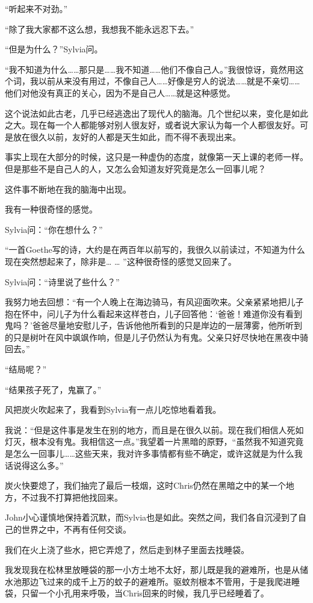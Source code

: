 \documentclass[UTF8]{article}
\begin{document}
\par “听起来不对劲。”
\par “除了我大家都不这么想，我想我不能永远忍下去。”
\par “但是为什么？”Sylvia问。
\par “我不知道为什么……那只是……我不知道……他们不像自己人。”我很惊讶，竟然用这个词，我以前从来没有用过，不像自己人……好像是穷人的说法……就是不亲切……他们对他没有真正的关心，因为不是自己人……就是这种感觉。
\par 这个说法如此古老，几乎已经逃逸出了现代人的脑海。几个世纪以来，变化是如此之大。现在每一个人都能够对别人很友好，或者说大家认为每一个人都很友好。可是放在很久以前，友好的人都是天生如此，而不得不表现出来。
\par 事实上现在大部分的时候，这只是一种虚伪的态度，就像第一天上课的老师一样。但是那些不是自己人的人，又怎么会知道友好究竟是怎么一回事儿呢？
\par 这件事不断地在我的脑海中出现。
\par 我有一种很奇怪的感觉。
\par Sylvia问：“你在想什么？”
\par “一首Goethe写的诗，大约是在两百年以前写的，我很久以前读过，不知道为什么现在突然想起来了，除非是… … ”这种很奇怪的感觉又回来了。
\par Sylvia问：“诗里说了些什么？”
\par 我努力地去回想：“有一个人晚上在海边骑马，有风迎面吹来。父亲紧紧地把儿子抱在怀中，问儿子为什么看起来这样苍白，儿子回答他：‘爸爸！难道你没有看到鬼吗？’爸爸尽量地安慰儿子，告诉他他所看到的只是岸边的一层薄雾，他所听到的只是树叶在风中飒飒作响，但是儿子仍然认为有鬼。父亲只好尽快地在黑夜中骑回去。”
\par “结局呢？”
\par “结果孩子死了，鬼赢了。”
\par 风把炭火吹起来了，我看到Sylvia有一点儿吃惊地看着我。
\par 我说：“但是这件事是发生在别的地方，而且是在很久以前。现在我们相信人死如灯灭，根本没有鬼。我相信这一点。”我望着一片黑暗的原野，“虽然我不知道究竟是怎么一回事儿……这些天来，我对许多事情都有些不确定，或许这就是为什么我话说得这么多。”
\par 炭火快要熄了，我们抽完了最后一枝烟，这时Chris仍然在黑暗之中的某一个地方，不过我不打算把他找回来。
\par John小心谨慎地保持着沉默，而Sylvia也是如此。突然之间，我们各自沉浸到了自己的世界之中，不再有任何交谈。
\par 我们在火上浇了些水，把它弄熄了，然后走到林子里面去找睡袋。
\par 我发现我在松林里放睡袋的那一小方土地不太好，那儿既是我的避难所，也是从储水池那边飞过来的成千上万的蚊子的避难所。驱蚊剂根本不管用，于是我爬进睡袋，只留一个小孔用来呼吸，当Chris回来的时候，我几乎已经睡着了。
\end{document}
